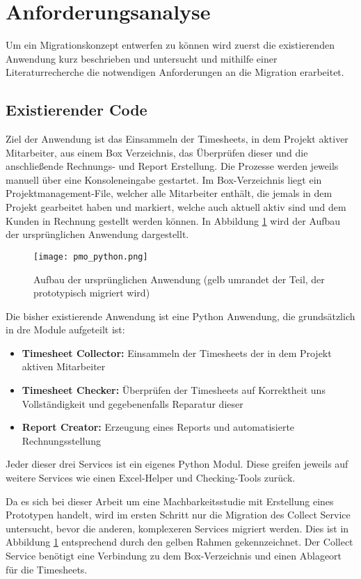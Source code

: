 \section{Anforderungsanalyse}

Um ein Migrationskonzept entwerfen zu können wird zuerst die existierenden Anwendung kurz beschrieben und untersucht und mithilfe einer Literaturrecherche die notwendigen Anforderungen an die Migration erarbeitet.

\subsection{Existierender Code}
Ziel der Anwendung ist das Einsammeln der Timesheets, in dem Projekt aktiver Mitarbeiter, aus einem Box Verzeichnis, das Überprüfen dieser und die anschließende Rechnungs- und Report Erstellung. Die Prozesse werden jeweils manuell über eine Konsoleneingabe gestartet. Im Box-Verzeichnis liegt ein Projektmanagement-File, welcher alle Mitarbeiter enthält, die jemals in dem Projekt gearbeitet haben und markiert, welche auch aktuell aktiv sind und dem Kunden in Rechnung gestellt werden können. In Abbildung \ref{fig:pmo_python} wird der Aufbau der ursprünglichen Anwendung dargestellt.

\begin{figure}[H]
    \centering
    \texttt{[image: pmo\_python.png]}
    \caption{Aufbau der ursprünglichen Anwendung (gelb umrandet der Teil, der prototypisch migriert wird)}
    \label{fig:pmo_python}
\end{figure}

Die bisher existierende Anwendung ist eine Python Anwendung, die grundsätzlich in dre Module aufgeteilt ist:
\begin{itemize}
\item \textbf{Timesheet Collector: }Einsammeln der Timesheets der in dem Projekt aktiven Mitarbeiter
\item \textbf{Timesheet Checker: }Überprüfen der Timesheets auf Korrektheit uns Vollständigkeit und gegebenenfalls Reparatur dieser
\item \textbf{Report Creator: }Erzeugung eines Reports und automatisierte Rechnungsstellung
\end{itemize}

Jeder dieser drei Services ist ein eigenes Python Modul. Diese greifen jeweils auf weitere Services wie einen Excel-Helper und Checking-Tools zurück.

Da es sich bei dieser Arbeit um eine Machbarkeitsstudie mit Erstellung eines Prototypen handelt, wird im ersten Schritt nur die Migration des Collect Service untersucht, bevor die anderen, komplexeren Services migriert werden. Dies ist in Abbildung \ref{fig:pmo_python} entsprechend durch den gelben Rahmen gekennzeichnet. Der Collect Service benötigt eine Verbindung zu dem Box-Verzeichnis und einen Ablageort für die \grqq{} Timesheets.

